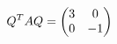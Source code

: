 \documentclass[preview]{standalone}
\begin{document}
\begin{align*}
\special{dvisvgm:raw <g id='unique000'>}Q^TAQ=\begin{pmatrix}3&0\\0&-1\end{pmatrix}\special{dvisvgm:raw </g>}
\end{align*}
\end{document}

